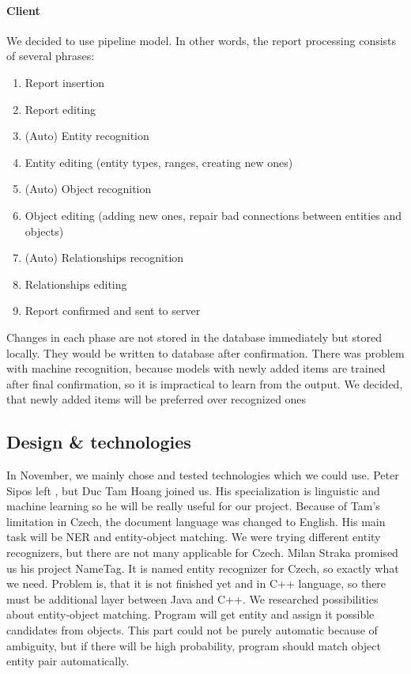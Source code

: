 \paragraph{Client}
We decided to use pipeline model. %
In other words, the report processing consists of several phrases:

\begin{enumerate}
\item Report insertion
\item Report editing
\item (Auto) Entity recognition
\item Entity editing (entity types, ranges, creating new ones)
\item (Auto) Object recognition
\item Object editing (adding new ones, repair bad connections between entities and objects)
\item (Auto) Relationships recognition
\item Relationships editing
\item Report confirmed and sent to server
\end{enumerate}

Changes in each phase are not stored in the database immediately but
stored locally. They would be written to database after confirmation. There was problem with
machine recognition, because models with newly added items are trained after final 
confirmation, so it is impractical to learn from the output. 
We decided, that newly added items will be preferred over recognized ones
 
\subsection{Design \& technologies}
In November, we mainly chose and tested technologies which we could use. Peter
Sipos left \textan{}, but Duc Tam Hoang joined us. His specialization is
linguistic and machine learning so he will be really useful for our project.
Because of Tam's limitation in Czech, the document language was changed to English.
His main task will be NER and entity-object matching. We were trying different
entity recognizers, but there are not many applicable for Czech. Milan Straka
promised us his project NameTag. It is named entity recognizer for Czech, so
exactly what we need. Problem is, that it is not finished yet and in C++
language, so there must be additional layer between Java and C++.
We researched possibilities about entity-object matching. Program will get
entity and assign it possible candidates from objects. This part could not be
purely automatic because of ambiguity, but if there will be high probability,
program should match object entity pair automatically.


